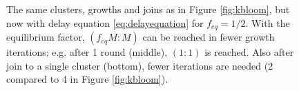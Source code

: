 \begin{figure}[htbp]
\begin{tikzpicture}
  \end{tikzpicture}
  \caption{The same clusters, growths and joins as in Figure \ref{fig:kbloom}, but now with delay equation \eqref{eq:delayequation} for $f_{eq} = 1/2$. With the equilibrium factor, $(f_{eq}M:M)$ can be reached in fewer growth iterations; e.g. after 1 round (middle), $(1:1)$ is reached. Also after join to a single cluster (bottom), fewer iterations are needed (2 compared to 4 in Figure \ref{fig:kbloom}).}\label{fig:kbloom2}
\end{figure}